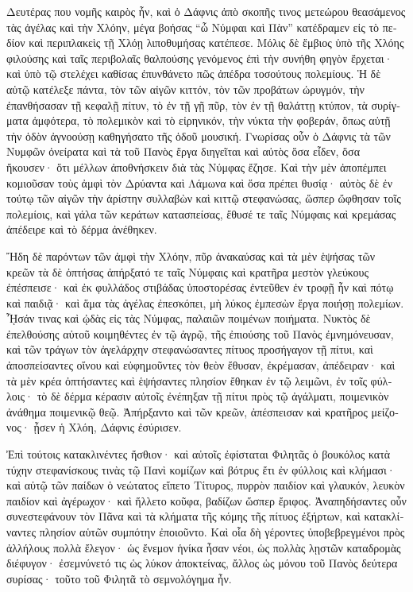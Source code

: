 \documentclass{book}
\begin{document}
\begin{pairs}
\begin{Leftside}
\begin{greek}
  Δευτέρας που νομῆς καιρὸς ἦν, καὶ ὁ Δάφνις ἀπὸ σκοπῆς τινος μετεώρου θεασάμενος τὰς ἀγέλας καὶ τὴν Χλόην, μέγα βοήσας “ὦ Νύμφαι καὶ Πὰν” κατέδραμεν εἰς τὸ πεδίον καὶ περιπλακεὶς τῇ Χλόῃ λιποθυμήσας κατέπεσε.  Μόλις δὲ ἔμβιος ὑπὸ τῆς Χλόης φιλούσης καὶ ταῖς περιβολαῖς θαλπούσης γενόμενος ἐπὶ τὴν συνήθη φηγὸν ἔρχεται· καὶ ὑπὸ τῷ στελέχει καθίσας ἐπυνθάνετο πῶς ἀπέδρα τοσούτους πολεμίους.  Ἡ δὲ αὐτῷ κατέλεξε πάντα, τὸν τῶν αἰγῶν κιττόν, τὸν τῶν προβάτων ὠρυγμόν, τὴν ἐπανθήσασαν τῇ κεφαλῇ πίτυν, τὸ ἐν τῇ γῇ πῦρ, τὸν ἐν τῇ θαλάττῃ κτύπον, τὰ συρίγματα ἀμφότερα, τὸ πολεμικὸν καὶ τὸ εἰρηνικόν, τὴν νύκτα τὴν φοβεράν, ὅπως αὐτῇ τὴν ὁδὸν ἀγνοούσῃ καθηγήσατο τῆς ὁδοῦ μουσική.  Γνωρίσας οὖν ὁ Δάφνις τὰ τῶν Νυμφῶν ὀνείρατα καὶ τὰ τοῦ Πανὸς ἔργα διηγεῖται καὶ αὐτὸς ὅσα εἶδεν, ὅσα ἤκουσεν· ὅτι μέλλων ἀποθνήσκειν διὰ τὰς Νύμφας ἔζησε.  Καὶ τὴν μὲν ἀποπέμπει κομιοῦσαν τοὺς ἀμφὶ τὸν Δρύαντα καὶ Λάμωνα καὶ ὅσα πρέπει θυσίᾳ· αὐτὸς δὲ ἐν τούτῳ τῶν αἰγῶν τὴν ἀρίστην συλλαβὼν καὶ κιττῷ στεφανώσας, ὥσπερ ὤφθησαν τοῖς πολεμίοις, καὶ γάλα τῶν κεράτων κατασπείσας, ἔθυσέ τε ταῖς Νύμφαις καὶ κρεμάσας ἀπέδειρε καὶ τὸ δέρμα ἀνέθηκεν.
\pend


  Ἤδη δὲ παρόντων τῶν ἀμφὶ τὴν Χλόην, πῦρ ἀνακαύσας καὶ τὰ μὲν ἑψήσας τῶν κρεῶν τὰ δὲ ὀπτήσας ἀπήρξατό τε ταῖς Νύμφαις καὶ κρατῆρα μεστὸν γλεύκους ἐπέσπεισε· καὶ ἐκ φυλλάδος στιβάδας ὑποστορέσας ἐντεῦθεν ἐν τροφῇ ἦν καὶ πότῳ καὶ παιδιᾷ· καὶ ἅμα τὰς ἀγέλας ἐπεσκόπει, μὴ λύκος ἐμπεσὼν ἔργα ποιήσῃ πολεμίων.  ᾞσάν τινας καὶ ᾠδὰς εἰς τὰς Νύμφας, παλαιῶν ποιμένων ποιήματα. Νυκτὸς δὲ ἐπελθούσης αὐτοῦ κοιμηθέντες ἐν τῷ ἀγρῷ, τῆς ἐπιούσης τοῦ Πανὸς ἐμνημόνευσαν, καὶ τῶν τράγων τὸν ἀγελάρχην στεφανώσαντες πίτυος προσήγαγον τῇ πίτυι, καὶ ἀποσπείσαντες οἴνου καὶ εὐφημοῦντες τὸν θεὸν ἔθυσαν, ἐκρέμασαν, ἀπέδειραν·  καὶ τὰ μὲν κρέα ὀπτήσαντες καὶ ἑψήσαντες πλησίον ἔθηκαν ἐν τῷ λειμῶνι, ἐν τοῖς φύλλοις· τὸ δὲ δέρμα κέρασιν αὐτοῖς ἐνέπηξαν τῇ πίτυι πρὸς τῷ ἀγάλματι, ποιμενικὸν ἀνάθημα ποιμενικῷ θεῷ. Ἀπήρξαντο καὶ τῶν κρεῶν, ἀπέσπεισαν καὶ κρατῆρος μείζονος· ᾖσεν ἡ Χλόη, Δάφνις ἐσύρισεν.
\pend


  Ἐπὶ τούτοις κατακλινέντες ἤσθιον· καὶ αὐτοῖς ἐφίσταται Φιλητᾶς ὁ βουκόλος κατὰ τύχην στεφανίσκους τινὰς τῷ Πανὶ κομίζων καὶ βότρυς ἔτι ἐν φύλλοις καὶ κλήμασι· καὶ αὐτῷ τῶν παίδων ὁ νεώτατος εἵπετο Τίτυρος, πυρρὸν παιδίον καὶ γλαυκόν, λευκὸν παιδίον καὶ ἀγέρωχον· καὶ ἥλλετο κοῦφα, βαδίζων ὥσπερ ἔριφος.  Ἀναπηδήσαντες οὖν συνεστεφάνουν τὸν Πᾶνα καὶ τὰ κλήματα τῆς κόμης τῆς πίτυος ἐξήρτων, καὶ κατακλίναντες πλησίον αὑτῶν συμπότην ἐποιοῦντο.  Καὶ οἷα δὴ γέροντες ὑποβεβρεγμένοι πρὸς ἀλλήλους πολλὰ ἔλεγον· ὡς ἔνεμον ἡνίκα ἦσαν νέοι, ὡς πολλὰς λῃστῶν καταδρομὰς διέφυγον· ἐσεμνύνετό τις ὡς λύκον ἀποκτείνας, ἄλλος ὡς μόνου τοῦ Πανὸς δεύτερα συρίσας· τοῦτο τοῦ Φιλητᾶ τὸ σεμνολόγημα ἦν.
\pend



\end{greek}
\end{Leftside}
\end{pairs}
\end{document}
